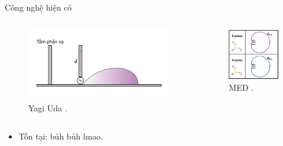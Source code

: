 \begin{frame}{Công nghệ hiện có}
    \vspace{-6mm}
    \begin{columns}
        \begin{figure}
            \centering
            \includegraphics[width=1.0\linewidth]{Figures/Yagi.pdf}
            \caption{Yagi Uda \cite{10818738} \cite{7001061} \cite{7636946}.}
            \label{fig:Yagi_uda}
        \end{figure}
        \begin{figure}
            \centering
            \includegraphics[width=0.75\linewidth]{Figures/MED.pdf}
            \caption{MED \cite{10621581} \cite{7815297} \cite{8753674} \cite{8421283} \cite{9789208}.}
            \label{fig:MED}
        \end{figure}
    \end{columns}
    \begin{itemize}
        \item Tồn tại: bủh bủh lmao.
    \end{itemize}
\end{frame}

